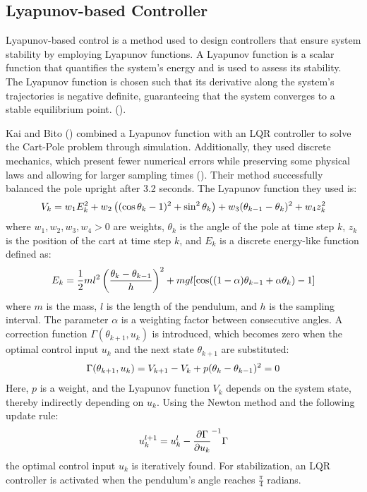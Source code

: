 \subsection{Lyapunov-based Controller}

Lyapunov-based control is a method used to design controllers that ensure system stability by employing Lyapunov functions. A Lyapunov function is a scalar function that quantifies the system's energy and is used to assess its stability. The Lyapunov function is chosen such that its derivative along the system's trajectories is negative definite, guaranteeing that the system converges to a stable equilibrium point. (\cite{slotine_applied_1991}).

Kai and Bito (\citeyear{kai_new_2014}) combined a Lyapunov function with an LQR controller to solve the Cart-Pole problem through simulation. Additionally, they used discrete mechanics, which present fewer numerical errors while preserving some physical laws and allowing for larger sampling times (\cite{marsden_discrete_2001}). Their method successfully balanced the pole upright after 3.2 seconds. The Lyapunov function they used is:
\begin{align}
    V_k = w_1E_k^2 + w_2\left((\cos\theta_k-1)^2 + \sin^2\theta_k\right) + w_3(\theta_{k-1} - \theta_k)^2 + w_4z_k^2 \notag
\end{align}
where $w_1, w_2, w_3, w_4 > 0$ are weights, $\theta_k$ is the angle of the pole at time step $k$, $z_k$ is the position of the cart at time step $k$, and $E_k$ is a discrete energy-like function defined as:
\begin{align}
    E_k = \frac{1}{2}ml^2\left(\frac{\theta_k - \theta_{k-1}}{h}\right)^2 + mgl[\cos((1-\alpha)\theta_{k-1} + \alpha\theta_k) - 1] \notag
\end{align}
where $m$ is the mass, $l$ is the length of the pendulum, and $h$ is the sampling interval. The parameter $\alpha$ is a weighting factor between consecutive angles. A correction function $\Gamma(\theta_{k+1}, u_k)$ is introduced, which becomes zero when the optimal control input $u_k$ and the next state $\theta_{k+1}$ are substituted:
\begin{align}
    \Gamma(\theta_{k+1}, u_k) = V_{k+1} - V_k + p(\theta_k - \theta_{k-1})^2 = 0 \notag
\end{align}
Here, $p$ is a weight, and the Lyapunov function $V_k$ depends on the system state, thereby indirectly depending on $u_k$. Using the Newton method and the following update rule:
\begin{align}
    u_{k}^{l+1} = u_k^l - \frac{\partial\Gamma}{\partial u_k}^{-1}\Gamma \notag
\end{align}
the optimal control input $u_k$ is iteratively found. For stabilization, an LQR controller is activated when the pendulum's angle reaches $\frac{\pi}{4}$ radians.

